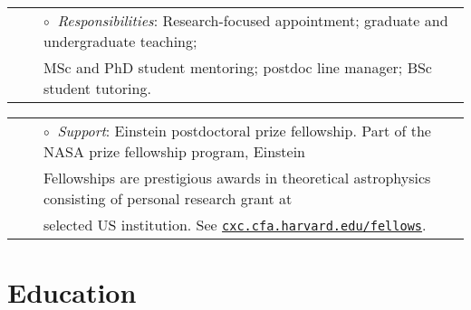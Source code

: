 

\vspace{-0.1cm}
\begin{tabular}{rcl}
&\hspace{0.4cm} &$\circ\;\;${\textit{Responsibilities}}: Research-focused appointment; graduate and undergraduate teaching; \\&\hspace{0.4cm} &  
\hspace{0.4cm}
MSc and PhD student mentoring; postdoc line manager; BSc student tutoring.\\
\end{tabular}
\vspace{0.2cm}

\vspace{-0.1cm}
\begin{tabular}{rcl}
&\hspace{0.4cm} &$\circ\;\;${\textit{Support}}: Einstein postdoctoral prize fellowship.  Part of the NASA prize fellowship program, Einstein\\
&\hspace{0.4cm} &  \hspace{0.4cm}Fellowships are prestigious awards in theoretical astrophysics consisting of personal research grant at\\
&\hspace{0.4cm} &  \hspace{0.4cm}selected US institution. See  \href{http://cxc.cfa.harvard.edu/fellows}{\texttt{cxc.cfa.harvard.edu/fellows}}.\\
\end{tabular}


\section{Education}


